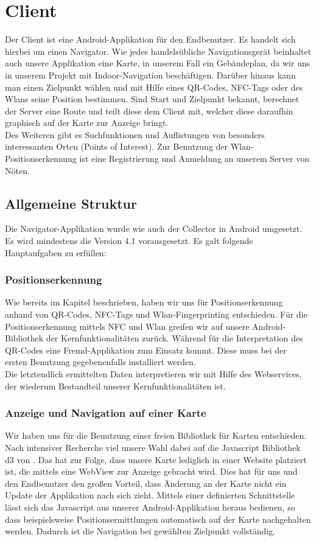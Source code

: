 \chapter{Client}
Der Client ist eine Android-Applikation für den Endbenutzer. Es handelt sich hierbei um einen Navigator. 
Wie jedes handelsübliche Navigationsgerät beinhaltet auch unsere Applikation eine Karte, in unserem Fall ein Gebäudeplan, 
da wir uns in unserem Projekt mit Indoor-Navigation beschäftigen. Darüber hinaus kann man einen Zielpunkt wählen
und mit Hilfe eines QR-Codes, NFC-Tags oder des Wlans seine Position bestimmen. Sind Start und Zielpunkt bekannt, berechnet der Server
eine Route und teilt diese dem Client mit, welcher diese daraufhin graphisch auf der Karte zur Anzeige bringt. \\
Des Weiteren gibt es Suchfunktionen und Auflistungen von besonders interessanten Orten (Points of Interest).
Zur Benutzung der Wlan-Positionserkennung ist eine Registrierung und Anmeldung an unserem Server von Nöten.

\section{Allgemeine Struktur}
Die Navigator-Applikation wurde wie auch der Collector in Android umgesetzt. Es wird mindestens die Version 4.1 vorausgesetzt.
Es galt folgende Hauptaufgaben zu erfüllen:

\subsection{Positionserkennung}
Wie bereits im Kapitel  beschrieben, haben wir uns für Positionserkennung anhand von QR-Codes, NFC-Tags und Wlan-Fingerprinting entschieden.
Für die Positionserkennung mittels NFC und Wlan greifen wir auf unsere Android-Bibliothek der Kernfunktionalitäten zurück. Während für die Interpretation des QR-Codes
eine Fremd-Applikation zum Einsatz kommt. Diese muss bei der ersten Benutzung gegebenenfalls installiert werden. \\
Die letztendlich ermittelten Daten interpretieren wir mit Hilfe des Webservices, der wiederum Bestandteil unserer Kernfunktionalitäten ist.

\subsection{Anzeige und Navigation auf einer Karte}
Wir haben uns für die Benutzung einer freien Bibliothek für Karten entschieden. Nach intensiver Recherche viel unsere Wahl dabei auf die Javascript Bibliothek d3 von .
Das hat zur Folge, dass unsere Karte lediglich in einer Website platziert ist, die mittels eine WebView zur Anzeige gebracht wird. Dies hat für uns und den Endbenutzer
den großen Vorteil, dass Änderung an der Karte nicht ein Update der Applikation nach sich zieht.
Mittels einer definierten Schnittstelle lässt sich das Javascript aus unserer Android-Applikation heraus bedienen, so dass beispielsweise Positionsermittlungen automatisch 
auf der Karte nachgehalten werden. Dadurch ist die Navigation bei gewählten Zielpunkt vollständig.

